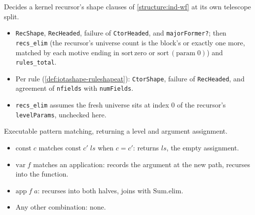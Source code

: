 \begin{example}
  \label{def:iotashape-checkshapes}
  \leanok

   Decides a kernel recursor's shape clauses of \ref{structure:ind-wf} at its own
  telescope split.
  \begin{itemize}
  \item \texttt{RecShape}, \texttt{RecHeaded}, failure of \texttt{CtorHeaded}, and
        \texttt{majorFormer?}; then \texttt{recs\_elim} (the recursor's universe count is the
        block's or exactly one more, matched by each motive ending in $\mathrm{sort}\,\mathrm{zero}$
        or $\mathrm{sort}\,(\mathrm{param}\;0)$) and \texttt{rules\_total}.
  \item Per rule (\ref{def:iotashape-ruleshapeat}): \texttt{CtorShape}, failure of
        \texttt{RecHeaded}, and agreement of \texttt{nfields} with \texttt{numFields}.
  \item {} \texttt{recs\_elim} assumes the fresh universe sits at index $0$ of the
        recursor's \texttt{levelParams}, unchecked here.
  \end{itemize}
\end{example}

\begin{example}
  \label{def:iotashape-matchpat}
  \leanok

   Executable pattern matching, returning a level and argument assignment.
  \begin{itemize}
  \item $\mathrm{const}\;c$ matches $\mathrm{const}\;c'\;ls$ when $c=c'$: returns $ls$, the empty
        assignment.
  \item $\mathrm{var}\;f$ matches an application: records the argument at the new path, recurses
        into the function.
  \item $\mathrm{app}\;f\;a$: recurses into both halves, joins with $\mathrm{Sum.elim}$.
  \item Any other combination: $\mathrm{none}$.
  \end{itemize}
\end{example}

